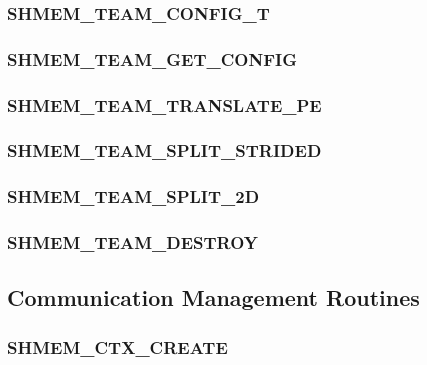\documentclass[10pt,oneside]{book}
\begin{document}
\subsubsection{\textbf{SHMEM\_TEAM\_CONFIG\_T}}
\label{subsec:shmem_team_config_t}


\subsubsection{\textbf{SHMEM\_TEAM\_GET\_CONFIG}}\label{subsec:shmem_team_get_config}


\subsubsection{\textbf{SHMEM\_TEAM\_TRANSLATE\_PE}}\label{subsec:shmem_team_translate_pe}


\subsubsection{\textbf{SHMEM\_TEAM\_SPLIT\_STRIDED}}\label{subsec:shmem_team_split_strided}


\subsubsection{\textbf{SHMEM\_TEAM\_SPLIT\_2D}}\label{subsec:shmem_team_split_2d}


\subsubsection{\textbf{SHMEM\_TEAM\_DESTROY}}\label{subsec:shmem_team_destroy}




\subsection{Communication Management Routines}\label{sec:ctx}


\subsubsection{\textbf{SHMEM\_CTX\_CREATE}}
\label{subsec:shmem_ctx_create}

\end{document}
